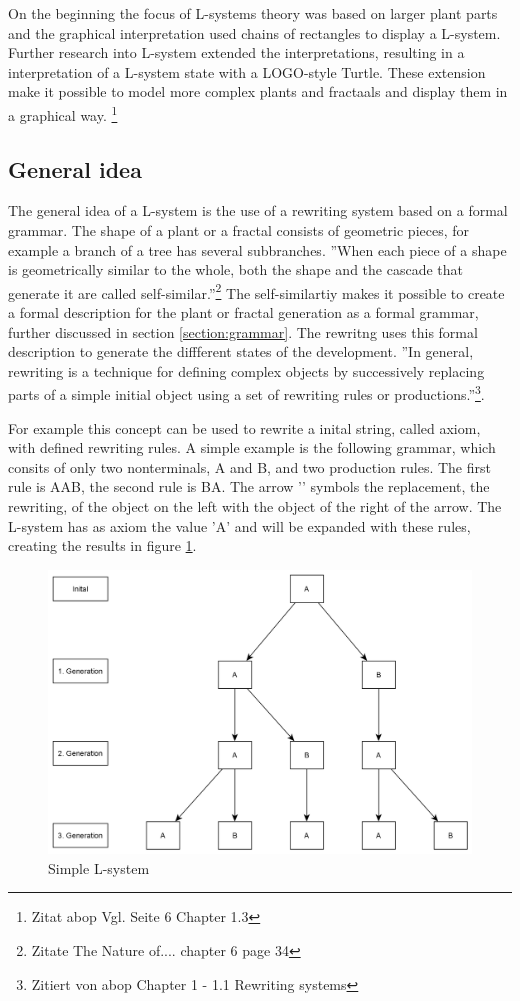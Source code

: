 \documentclass[english]{cpp-hmwk}
\begin{document}
On the beginning the focus of L-systems theory was based on larger plant parts and the graphical interpretation used chains of rectangles to display a L-system. Further research into L-system extended the interpretations, resulting in a interpretation of a L-system state with a LOGO-style Turtle. These extension make it possible to model more complex plants and fractaals and display them in a graphical way. \footnote{Zitat abop Vgl. Seite 6 Chapter 1.3}

\subsection{General idea}
The general idea of a L-system is the use of a rewriting system based on a formal grammar. The shape of a plant or a fractal consists of geometric pieces, for example a branch of a tree has several subbranches. ''When each piece of a shape is geometrically similar to the whole, both the shape and the cascade that generate it are called self-similar.''\footnote{Zitate The Nature of....  chapter 6 page 34 } The self-similartiy makes it possible to create a formal description for the plant or fractal generation as a formal grammar, further discussed in  section \ref{section:grammar}. The rewritng uses this formal description to generate the diffferent states of the development. ''In general, rewriting is a technique for defining complex objects by successively replacing parts of a simple initial object using a set of rewriting rules or productions.''\footnote{Zitiert von abop Chapter 1  - 1.1 Rewriting systems}. 

For example this concept can be used to rewrite a inital string, called axiom, with defined rewriting rules.
A simple example is the following grammar, which consits of only two nonterminals, A and B, and two production rules. 
The first rule is A\rightarrow AB, the second rule is B\rightarrow A. The arrow '\rightarrow' symbols the replacement, the rewriting, of the object on the left with the object of the right of the arrow.
The L-system has as axiom the value 'A' and will be expanded with these rules, creating the results in figure \ref{figure:simple_lsystem}.

\begin{figure}[h!]
	\centering
	\includegraphics[width=0.7\columnwidth]{../graphs/Examples/simple_lsystem.png}
	\caption{Simple L-system}
	\label{figure:simple_lsystem}
\end{figure}
\end{document}

